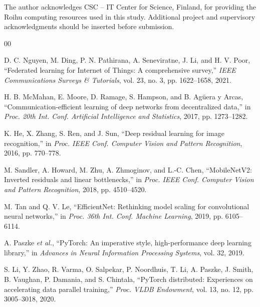 \documentclass[conference]{IEEEtran}
\begin{document}
The author acknowledges CSC -- IT Center for Science, Finland, for providing the Roihu computing resources used in this study. Additional project and supervisory acknowledgments should be inserted before submission.

\balance
\begin{thebibliography}{00}

D. C. Nguyen, M. Ding, P. N. Pathirana, A. Seneviratne, J. Li, and H. V. Poor,
``Federated learning for Internet of Things: A comprehensive survey,''
\emph{IEEE Communications Surveys \& Tutorials}, vol. 23, no. 3,
pp. 1622--1658, 2021.

H. B. McMahan, E. Moore, D. Ramage, S. Hampson, and B. Ag{\"u}era y Arcas,
``Communication-efficient learning of deep networks from decentralized data,''
in \emph{Proc. 20th Int. Conf. Artificial Intelligence and Statistics},
2017, pp. 1273--1282.

K. He, X. Zhang, S. Ren, and J. Sun,
``Deep residual learning for image recognition,''
in \emph{Proc. IEEE Conf. Computer Vision and Pattern Recognition},
2016, pp. 770--778.

M. Sandler, A. Howard, M. Zhu, A. Zhmoginov, and L.-C. Chen,
``MobileNetV2: Inverted residuals and linear bottlenecks,''
in \emph{Proc. IEEE Conf. Computer Vision and Pattern Recognition},
2018, pp. 4510--4520.

M. Tan and Q. V. Le,
``EfficientNet: Rethinking model scaling for convolutional neural networks,''
in \emph{Proc. 36th Int. Conf. Machine Learning},
2019, pp. 6105--6114.

A. Paszke \emph{et al.},
``PyTorch: An imperative style, high-performance deep learning library,''
in \emph{Advances in Neural Information Processing Systems}, vol. 32, 2019.

S. Li, Y. Zhao, R. Varma, O. Salpekar, P. Noordhuis, T. Li, A. Paszke,
J. Smith, B. Vaughan, P. Damania, and S. Chintala,
``PyTorch distributed: Experiences on accelerating data parallel training,''
\emph{Proc. VLDB Endowment}, vol. 13, no. 12, pp. 3005--3018, 2020.

\end{thebibliography}
\end{document}
